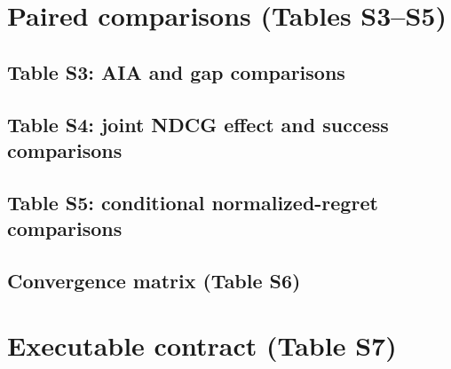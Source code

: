 \documentclass[pdflatex,sn-mathphys-num]{sn-jnl}
\begin{document}
\section{Paired comparisons (Tables S3--S5)}
\begin{landscape}
\subsection*{Table S3: AIA and gap comparisons}

\subsection*{Table S4: joint NDCG effect and success comparisons}

\subsection*{Table S5: conditional normalized-regret comparisons}

\end{landscape}
\clearpage
\begin{landscape}
\section{Convergence matrix (Table S6)}

\end{landscape}
\clearpage
\section{Executable contract (Table S7)}

\end{document}
